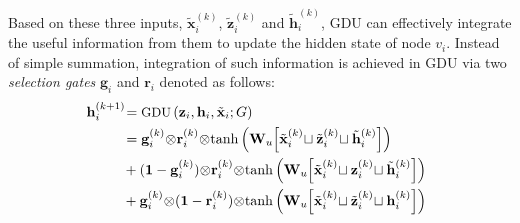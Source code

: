 \documentclass{article}
\newcommand{\mb}{\mathbf}
\newcommand{\gdu}{\textsc{GDU}}
\begin{document}
Based on these three inputs, $\tilde{\mb{x}}_i^{(k)}$, $\tilde{\mb{z}}_{i}^{(k)}$ and $\tilde{\mb{h}}_i^{(k)}$, {\gdu} can effectively integrate the useful information from them to update the hidden state of node $v_i$. Instead of simple summation, integration of such information is achieved in {\gdu} via two \textit{selection gates} $\mb{g}_i$ and $\mb{r}_i$ denoted as follows: \begingroup\makeatletter\def\f@size{8}\check@mathfonts 
\begin{equation}\label{equ:gdu}
\begin{aligned}
 \hspace{-5pt} \mb{h}_i^{(k+1)}  \hspace{-2pt} &= \mbox{\small GDU}\left( \mb{z}_i, \mb{h}_i, \tilde{\mb{x}}_i; G \right)\\
 &= \mb{g}_i^{(k)} \hspace{-2pt} \otimes \hspace{-2pt} \mb{r}_i^{(k)} \hspace{-2pt} \otimes \hspace{-2pt} \tanh \left(\mb{W}_u  \hspace{-2pt} \left[\tilde{\mb{x}}_i^{(k)} \hspace{-2pt} \sqcup \tilde{\mb{z}}_i^{(k)}  \hspace{-2pt} \sqcup \tilde{\mb{h}}_i^{(k)} \right] \right) \\
&+ (\mb{1} - \mb{g}_i^{(k)}) \hspace{-2pt} \otimes \hspace{-2pt} \mb{r}_i^{(k)} \hspace{-2pt} \otimes \hspace{-2pt} \tanh \left(\mb{W}_u  \hspace{-2pt} \left[\tilde{\mb{x}}_i^{(k)}  \hspace{-2pt} \sqcup \mb{z}_i^{(k)}  \hspace{-2pt} \sqcup \tilde{\mb{h}}_i^{(k)} \right] \right)\\
&+ \mb{g}_i^{(k)} \hspace{-2pt} \otimes \hspace{-2pt} (\mb{1} - \mb{r}_i^{(k)}) \hspace{-2pt} \otimes \hspace{-2pt} \tanh \left(\mb{W}_u  \hspace{-2pt} \left[\tilde{\mb{x}}_i^{(k)}  \hspace{-2pt} \sqcup \tilde{\mb{z}}_i^{(k)}  \hspace{-2pt} \sqcup \mb{h}_i^{(k)} \right] \right)\\

\end{aligned}
\end{equation}
\end{document}
